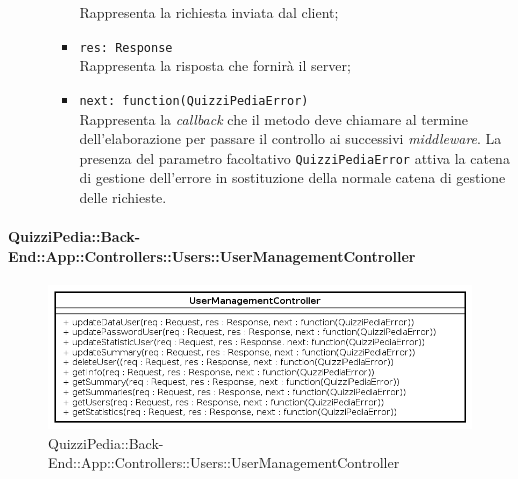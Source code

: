 \begin{itemize}
\begin{itemize}
\begin{itemize}
			Rappresenta la richiesta inviata dal client;
		  \item
			\texttt{res: Response} \\
			Rappresenta la risposta che fornirà il server;
		  \item
		    \texttt{next: function(QuizziPediaError)} \\
			Rappresenta la \textit{callback} che il metodo deve chiamare al termine dell'elaborazione per passare il controllo ai successivi \textit{middleware}. La presenza del parametro facoltativo \texttt{QuizziPediaError} attiva la catena di gestione dell'errore in sostituzione della normale catena di gestione delle richieste.
		 \end{itemize}
	\end{itemize}	 
\end{itemize}	
\paragraph[QuizziPedia::Back-End::App::Controllers::Users\\::UserManagementController]{QuizziPedia::Back-End::App::Controllers::Users::UserManagementController}
\label{QuizziPedia::Back-End::App::Controllers::Users::UserManagementController}
\begin{figure}[ht]
	\centering
	\includegraphics[scale=0.45]{UML/Classi/Back-End/QuizziPedia_Back-End_App_Controllers_Users_UserManagementController.png}
	\caption{QuizziPedia::Back-End::App::Controllers::Users::UserManagementController}
\end{figure}
\FloatBarrier
